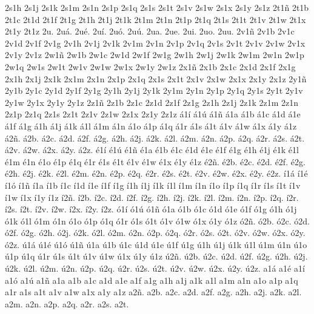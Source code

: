 2s1h
2s1j
2s1k
2s1m
2s1n
2s1p
2s1q
2s1s
2s1t
2s1v
2s1w
2s1x
2s1y
2s1z
2t1\~n
2t1b
2t1c
2t1d
2t1f
2t1g
2t1h
2t1j
2t1k
2t1m
2t1n
2t1p
2t1q
2t1s
2t1t
2t1v
2t1w
2t1x
2t1y
2t1z
2u.
2u\'a.
2u\'e.
2u\'i.
2u\'o.
2u\'u.
2ua.
2ue.
2ui.
2uo.
2uu.
2v1\~n
2v1b
2v1c
2v1d
2v1f
2v1g
2v1h
2v1j
2v1k
2v1m
2v1n
2v1p
2v1q
2v1s
2v1t
2v1v
2v1w
2v1x
2v1y
2v1z
2w1\~n
2w1b
2w1c
2w1d
2w1f
2w1g
2w1h
2w1j
2w1k
2w1m
2w1n
2w1p
2w1q
2w1s
2w1t
2w1v
2w1w
2w1x
2w1y
2w1z
2x1\~n
2x1b
2x1c
2x1d
2x1f
2x1g
2x1h
2x1j
2x1k
2x1m
2x1n
2x1p
2x1q
2x1s
2x1t
2x1v
2x1w
2x1x
2x1y
2x1z
2y1\~n
2y1b
2y1c
2y1d
2y1f
2y1g
2y1h
2y1j
2y1k
2y1m
2y1n
2y1p
2y1q
2y1s
2y1t
2y1v
2y1w
2y1x
2y1y
2y1z
2z1\~n
2z1b
2z1c
2z1d
2z1f
2z1g
2z1h
2z1j
2z1k
2z1m
2z1n
2z1p
2z1q
2z1s
2z1t
2z1v
2z1w
2z1x
2z1y
2z1z
\'a1\'i
\'a1\'u
\'a1\~n
\'a1a
\'a1b
\'a1c
\'a1d
\'a1e
\'a1f
\'a1g
\'a1h
\'a1j
\'a1k
\'a1l
\'a1m
\'a1n
\'a1o
\'a1p
\'a1q
\'a1r
\'a1s
\'a1t
\'a1v
\'a1w
\'a1x
\'a1y
\'a1z
\'a2\~n.
\'a2b.
\'a2c.
\'a2d.
\'a2f.
\'a2g.
\'a2h.
\'a2j.
\'a2k.
\'a2l.
\'a2m.
\'a2n.
\'a2p.
\'a2q.
\'a2r.
\'a2s.
\'a2t.
\'a2v.
\'a2w.
\'a2x.
\'a2y.
\'a2z.
\'e1\'i
\'e1\'u
\'e1\~n
\'e1a
\'e1b
\'e1c
\'e1d
\'e1e
\'e1f
\'e1g
\'e1h
\'e1j
\'e1k
\'e1l
\'e1m
\'e1n
\'e1o
\'e1p
\'e1q
\'e1r
\'e1s
\'e1t
\'e1v
\'e1w
\'e1x
\'e1y
\'e1z
\'e2\~n.
\'e2b.
\'e2c.
\'e2d.
\'e2f.
\'e2g.
\'e2h.
\'e2j.
\'e2k.
\'e2l.
\'e2m.
\'e2n.
\'e2p.
\'e2q.
\'e2r.
\'e2s.
\'e2t.
\'e2v.
\'e2w.
\'e2x.
\'e2y.
\'e2z.
\'i1\'a
\'i1\'e
\'i1\'o
\'i1\~n
\'i1a
\'i1b
\'i1c
\'i1d
\'i1e
\'i1f
\'i1g
\'i1h
\'i1j
\'i1k
\'i1l
\'i1m
\'i1n
\'i1o
\'i1p
\'i1q
\'i1r
\'i1s
\'i1t
\'i1v
\'i1w
\'i1x
\'i1y
\'i1z
\'i2\~n.
\'i2b.
\'i2c.
\'i2d.
\'i2f.
\'i2g.
\'i2h.
\'i2j.
\'i2k.
\'i2l.
\'i2m.
\'i2n.
\'i2p.
\'i2q.
\'i2r.
\'i2s.
\'i2t.
\'i2v.
\'i2w.
\'i2x.
\'i2y.
\'i2z.
\'o1\'i
\'o1\'u
\'o1\~n
\'o1a
\'o1b
\'o1c
\'o1d
\'o1e
\'o1f
\'o1g
\'o1h
\'o1j
\'o1k
\'o1l
\'o1m
\'o1n
\'o1o
\'o1p
\'o1q
\'o1r
\'o1s
\'o1t
\'o1v
\'o1w
\'o1x
\'o1y
\'o1z
\'o2\~n.
\'o2b.
\'o2c.
\'o2d.
\'o2f.
\'o2g.
\'o2h.
\'o2j.
\'o2k.
\'o2l.
\'o2m.
\'o2n.
\'o2p.
\'o2q.
\'o2r.
\'o2s.
\'o2t.
\'o2v.
\'o2w.
\'o2x.
\'o2y.
\'o2z.
\'u1\'a
\'u1\'e
\'u1\'o
\'u1\~n
\'u1a
\'u1b
\'u1c
\'u1d
\'u1e
\'u1f
\'u1g
\'u1h
\'u1j
\'u1k
\'u1l
\'u1m
\'u1n
\'u1o
\'u1p
\'u1q
\'u1r
\'u1s
\'u1t
\'u1v
\'u1w
\'u1x
\'u1y
\'u1z
\'u2\~n.
\'u2b.
\'u2c.
\'u2d.
\'u2f.
\'u2g.
\'u2h.
\'u2j.
\'u2k.
\'u2l.
\'u2m.
\'u2n.
\'u2p.
\'u2q.
\'u2r.
\'u2s.
\'u2t.
\'u2v.
\'u2w.
\'u2x.
\'u2y.
\'u2z.
a1\'a
a1\'e
a1\'i
a1\'o
a1\'u
a1\~n
a1a
a1b
a1c
a1d
a1e
a1f
a1g
a1h
a1j
a1k
a1l
a1m
a1n
a1o
a1p
a1q
a1r
a1s
a1t
a1v
a1w
a1x
a1y
a1z
a2\~n.
a2b.
a2c.
a2d.
a2f.
a2g.
a2h.
a2j.
a2k.
a2l.
a2m.
a2n.
a2p.
a2q.
a2r.
a2s.
a2t.
